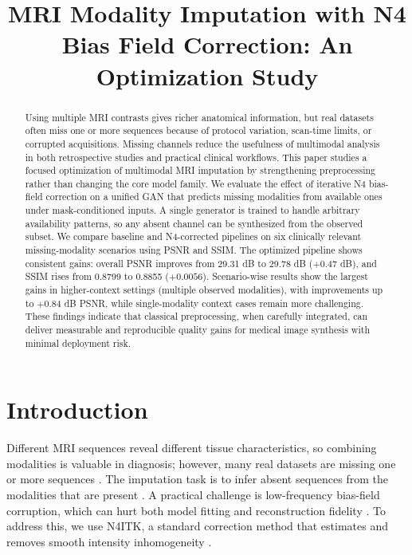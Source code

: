 \documentclass[conference]{IEEEtran}
\title{MRI Modality Imputation with N4 Bias Field Correction: An Optimization Study}
\author{
\IEEEauthorblockA{
Abhishek Misal . Nitin Kumar . Mohd Anas . Dr. Jignesh Patel
\\ Indian Institute of Information Technology Vadodara, \\ Gandhinagar, Gujarat
}
}
\begin{document}
\maketitle

\begin{abstract}
Using multiple MRI contrasts gives richer anatomical information, but real datasets often miss one or more sequences because of protocol variation, scan-time limits, or corrupted acquisitions. Missing channels reduce the usefulness of multimodal analysis in both retrospective studies and practical clinical workflows. This paper studies a focused optimization of multimodal MRI imputation by strengthening preprocessing rather than changing the core model family. We evaluate the effect of iterative N4 bias-field correction on a unified GAN that predicts missing modalities from available ones under mask-conditioned inputs. A single generator is trained to handle arbitrary availability patterns, so any absent channel can be synthesized from the observed subset. We compare baseline and N4-corrected pipelines on six clinically relevant missing-modality scenarios using PSNR and SSIM. The optimized pipeline shows consistent gains: overall PSNR improves from 29.31 dB to 29.78 dB ($+0.47$ dB), and SSIM rises from 0.8799 to 0.8855 ($+0.0056$). Scenario-wise results show the largest gains in higher-context settings (multiple observed modalities), with improvements up to $+0.84$ dB PSNR, while single-modality context cases remain more challenging. These findings indicate that classical preprocessing, when carefully integrated, can deliver measurable and reproducible quality gains for medical image synthesis with minimal deployment risk.
\end{abstract}

\section{Introduction}
Different MRI sequences reveal different tissue characteristics, so combining modalities is valuable in diagnosis; however, many real datasets are missing one or more sequences \cite{shen2021,iglesias2013}. The imputation task is to infer absent sequences from the modalities that are present \cite{shen2021,pan2018}. A practical challenge is low-frequency bias-field corruption, which can hurt both model fitting and reconstruction fidelity \cite{vovk2007}. To address this, we use N4ITK, a standard correction method that estimates and removes smooth intensity inhomogeneity \cite{tustison2010n4}.
\end{document}
